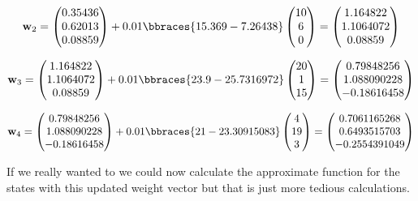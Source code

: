 \begin{solution}
\begin{align*}
  \textbf{w}_2
  =
  \begin{pmatrix}
    0.35436 \\
    0.62013 \\
    0.08859
  \end{pmatrix}
  +
  0.01\bbraces{15.369 - 7.26438}
  \begin{pmatrix}
    10 \\
    6 \\
    0
  \end{pmatrix}
  =
  \begin{pmatrix}
    1.164822 \\
    1.1064072 \\
    0.08859
  \end{pmatrix}
\end{align*}

\begin{align*}
  \textbf{w}_3
  =
  \begin{pmatrix}
    1.164822 \\
    1.1064072 \\
    0.08859
  \end{pmatrix}
  + 0.01\bbraces{23.9 - 25.7316972}
  \begin{pmatrix}
    20 \\
    1 \\
    15
  \end{pmatrix}
  =
  \begin{pmatrix}
    0.79848256 \\
    1.088090228 \\
    -0.18616458
  \end{pmatrix}
\end{align*}

\begin{align*}
  \textbf{w}_4
  =
  \begin{pmatrix}
    0.79848256 \\
    1.088090228 \\
    -0.18616458
  \end{pmatrix}
  + 0.01\bbraces{21 - 23.30915083}
  \begin{pmatrix}
    4 \\
    19 \\
    3
  \end{pmatrix}
  =
  \begin{pmatrix}
    0.7061165268 \\
    0.6493515703 \\
    -0.2554391049
  \end{pmatrix}
\end{align*}

If we really wanted to we could now calculate the approximate function for the states with this updated weight vector but that is just more tedious calculations.
\end{solution}

